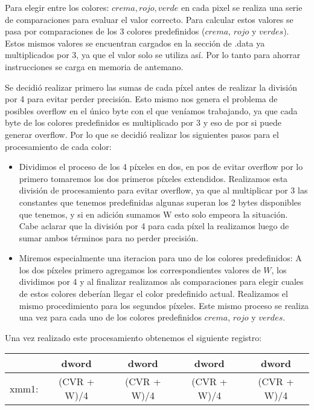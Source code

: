 Para elegir entre los colores: $crema, rojo, verde$ en cada pixel se realiza una serie de comparaciones para evaluar el valor correcto. Para calcular estos valores se pasa por comparaciones de los 3 colores predefinidos ($crema$, $rojo$ y $verdes$). Estos mismos valores se encuentran cargados en la sección de .data ya multiplicados por 3, ya que el valor solo se utiliza así. Por lo tanto para ahorrar instrucciones se carga en memoria de antemano. 

Se decidió realizar primero las sumas de cada píxel antes de realizar la división por 4 para evitar perder precisión. Esto mismo nos genera el problema de posibles overflow en el único byte con el que veníamos trabajando, ya que cada byte de los colores predefinidos es multiplicado por 3 y eso de por si puede generar overflow. Por lo que se decidió realizar los siguientes pasos para el procesamiento de cada color:

\begin{itemize}
  \item Dividimos el proceso de los 4 píxeles en dos, en pos de evitar overflow por lo primero tomaremos los dos primeros píxeles extendidos. Realizamos esta división de procesamiento para evitar overflow, ya que al multiplicar por 3 las constantes que tenemos predefinidas algunas superan los 2 bytes disponibles que tenemos, y si en adición sumamos W esto solo empeora la situación. Cabe aclarar que la división por 4 para cada píxel la realizamos luego de sumar ambos términos para no perder precisión.
  
  \item Miremos especialmente una iteracion para uno de los colores predefinidos: A los dos píxeles primero agregamos los correspondientes valores de $W$, los dividimos por 4 y al finalizar realizamos als comparaciones para elegir cuales de estos colores deberían llegar el color predefinido actual. Realizamos el mismo procedimiento para los segundos píxeles. 
  Este mismo proceso se realiza una vez para cada uno de los colores predefinidos $crema$, $rojo$ y $verdes$.
\end{itemize}

Una vez realizado este procesamiento obtenemos el siguiente registro:


\begin{table}[h]
\begin{center}
\begin{tabular}{|c|c|c|c|c|}
\hline
      & dword     & dword     & dword     & dword     \\ \hline
xmm1: & (CVR + W)/4     & (CVR + W)/4     & (CVR + W)/4     & (CVR + W)/4     \\ \hline
\end{tabular}
\end{center}
\end{table}

